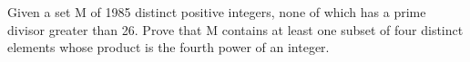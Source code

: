 \item Given a set M of 1985 distinct positive integers, none of which has a prime divisor greater than 26. Prove that M contains at least one subset of four distinct elements whose product is the fourth power of an integer.







